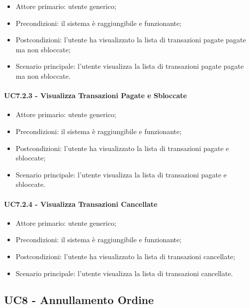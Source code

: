 \begin{itemize}
    \item Attore primario: utente generico;
    \item Precondizioni: il sistema è raggiungibile e funzionante;
    \item Postcondizioni: l'utente ha visualizzato la lista di transazioni pagate pagate ma non sbloccate;
    \item Scenario principale: l'utente visualizza la lista di transazioni pagate pagate ma non sbloccate.
\end{itemize}

\paragraph{UC7.2.3 - Visualizza Transazioni Pagate e Sbloccate}

\begin{itemize}
    \item Attore primario: utente generico;
    \item Precondizioni: il sistema è raggiungibile e funzionante;
    \item Postcondizioni: l'utente ha visualizzato la lista di transazioni pagate e sbloccate;
    \item Scenario principale: l'utente visualizza la lista di transazioni pagate e sbloccate.
\end{itemize}

\paragraph{UC7.2.4 - Visualizza Transazioni Cancellate}

\begin{itemize}
    \item Attore primario: utente generico;
    \item Precondizioni: il sistema è raggiungibile e funzionante;
    \item Postcondizioni: l'utente ha visualizzato la lista di transazioni cancellate;
    \item Scenario principale: l'utente visualizza la lista di transazioni cancellate.
\end{itemize}

\subsection{UC8 - Annullamento Ordine}

